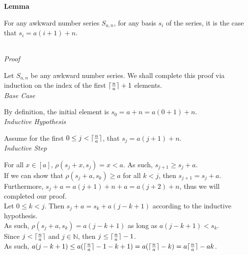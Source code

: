 \documentclass[a4paper,12pt]{article}
\DeclarePairedDelimiter{\ceil}{\lceil}{\rceil}
\begin{document}
\label{lemma:basis_lengths}
\hypertarget{lemma:basis_lengths}{}
\begin{tcolorbox}
\textbf{Lemma}

For any awkward number series $S_{a,n}$, for any basis $s_i$ of the series, it is the case that $s_i = a(i + 1) + n$.
\end{tcolorbox}

\noindent \\
\textit{Proof}

\noindent Let $S_{a,n}$ be any awkward number series. We shall complete this proof via induction on the index of the first $\ceil{\frac{n}{a}} + 1$ elements.\\


\noindent
\textit{Base Case}

\noindent By definition, the initial element is $s_0 = a + n = a(0 + 1) + n$.\\


\noindent
\textit{Inductive Hypothesis}

\noindent Assume for the first $0 \leq j < \ceil{\frac{n}{a}}$, that $s_j = a(j + 1) + n$.\\


\noindent
\textit{Inductive Step}

\noindent For all $x \in [a]$, $\rho(s_j + x, s_j) = x < a$. As such, $s_{j+1} \geq s_j + a$.\\

\noindent If we can show that $\rho(s_j + a, s_k) \geq a$ for all $k < j$, then $s_{j+1} = s_j + a$.\\

\noindent Furthermore, $s_j + a = a(j + 1) + n + a = a(j + 2) + n$, thus we will completed our proof.\\

\noindent Let $0 \leq k < j$. Then $s_j + a = s_k + a(j - k + 1)$ according to the inductive hypothesis.\\

\noindent As such, $\rho(s_j + a, s_k) = a(j - k + 1)$ as long as $a(j - k + 1) < s_k$.\\

\noindent Since $j < \ceil{\frac{n}{a}}$ and $j \in \mathbb{N}$, then $j \leq \ceil{\frac{n}{a}} - 1$.\\

\noindent As such, $a(j - k + 1) \leq a(\ceil{\frac{n}{a}} - 1 - k + 1) = a(\ceil{\frac{n}{a}} - k) = a\ceil{\frac{n}{a}} - ak$.\\
\end{document}
